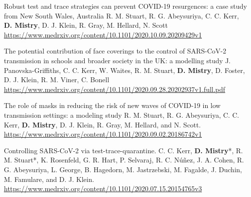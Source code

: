 \begin{cventries}
  \cvpublicationentrytwo
    {Robust test and trace strategies can prevent COVID-19 resurgences: a case study from New South Wales, Australia} %
    {R. M. Stuart, R. G. Abeysuriya, C. C. Kerr, \textbf{D. Mistry}, D. J. Klein, R. Gray, M. Hellard, N. Scott} %
    {} %
    {} %
    {} %
    {} %
    {} %
    {} %
    {\href{    https://www.medrxiv.org/content/10.1101/2020.10.09.20209429v1}{  https://www.medrxiv.org/content/10.1101/2020.10.09.20209429v1 \faLink\acvHeaderIconSep}
    } %
    \vspace{1.5mm}
    
  \cvpublicationentrytwo
    {The potential contribution of face coverings to the control of SARS-CoV-2 transmission in schools and broader society in the UK: a modelling study} %
    {J. Panovska-Griffiths, C. C. Kerr, W. Waites, R. M. Stuart, \textbf{D. Mistry}, D. Foster, D. J. Klein, R. M. Viner, C. Bonell} %
    {} %
    {} %
    {} %
    {} %
    {} %
    {} %
    {\href{    https://www.medrxiv.org/content/10.1101/2020.09.28.20202937v1.full.pdf}{    https://www.medrxiv.org/content/10.1101/2020.09.28.20202937v1.full.pdf \faLink\acvHeaderIconSep}
    } %
    \vspace{1.5mm}

  \cvpublicationentrytwo
    {The role of masks in reducing the risk of new waves of COVID-19 in low transmission settings: a modeling study} %
    {R. M. Stuart, R. G. Abeysuriya, C. C. Kerr, \textbf{D. Mistry}, D. J. Klein, R. Gray, M. Hellard, and N. Scott.} %
    {} %
    {} %
    {} %
    {} %
    {} %
    {} %
    {\href{  https://www.medrxiv.org/content/10.1101/2020.09.02.20186742v1}{   https://www.medrxiv.org/content/10.1101/2020.09.02.20186742v1 \faLink\acvHeaderIconSep}
    } %
    \vspace{1.5mm}

  \cvpublicationentrytwo
    {Controlling SARS-CoV-2 via test-trace-quarantine.} %
    {C. C. Kerr, \textbf{D. Mistry}*,  R. M. Stuart*, K. Rosenfeld, G. R. Hart, P. Selvaraj, R. C. N\'{u}\~{n}ez, J. A. Cohen, R. G. Abeysuriya, L. George, B. Hagedorn, M. Jastrzebski, M. Fagalde, J. Duchin, M. Famulare, and D. J. Klein.} %
    {} %
    {} %
    {} %
    {} %
    {} %
    {\hspace{-6mm}} %
    {\href{https://www.medrxiv.org/content/10.1101/2020.07.15.20154765v3}{https://www.medrxiv.org/content/10.1101/2020.07.15.20154765v3 \faLink\acvHeaderIconSep}} %
    \vspace{1.5mm}
    

\end{cventries}
